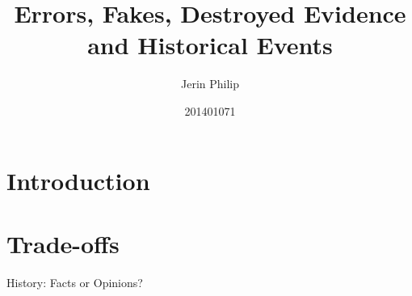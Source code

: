 \documentclass[a4paper]{article}
\title{Errors, Fakes, Destroyed Evidence and Historical Events}
\author{Jerin Philip}
\date{201401071}
\begin{document}
\maketitle

\section{Introduction}


\section{Trade-offs}
History: Facts or Opinions? 

\printbibliography 
\end{document}
